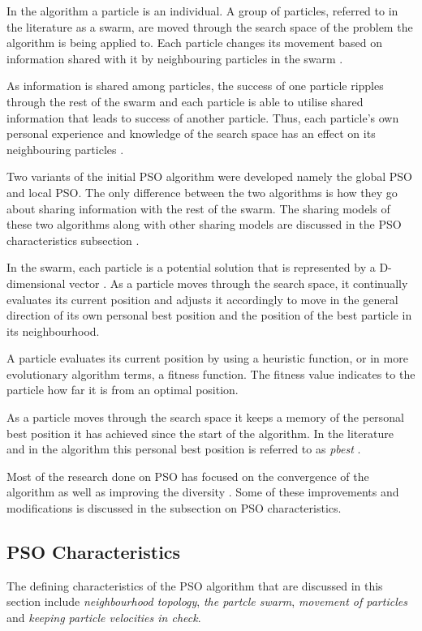 In the algorithm a particle is an individual\cite{FundamentalSwarm}. A group of particles, referred to in the literature as a swarm,  are moved through the search space of the problem the algorithm is being applied to\cite{FundamentalSwarm}. Each particle changes its movement based on information shared with it by neighbouring particles in the swarm \cite{FundamentalSwarm,CompuIntelligenceIntro}. 

As information is shared among particles, the success of one particle ripples through the rest of the swarm and each particle is able to utilise shared information that leads to success of another particle. Thus, each particle's own personal experience and knowledge of the search space has an effect on its neighbouring particles \cite{FundamentalSwarm,CompuIntelligenceIntro}.

Two variants of the initial \gls{PSO} algorithm were developed namely the global \gls{PSO} and local \gls{PSO}. The only difference between the two algorithms is how they go about sharing information with the rest of the swarm. The sharing models of these two algorithms along with other sharing models are discussed in the \gls{PSO} characteristics subsection \cite{SOSwarm}.

In the swarm, each particle is a potential solution that is represented by a D-dimensional vector \cite{PSOHybridJobShop,PSOSelfHierarch}. As a particle moves through the search space, it continually evaluates its current position and adjusts it accordingly to move in the general direction of its own personal best position and the position of the best particle in its neighbourhood. 

A particle evaluates its current position by using a heuristic function, or in more evolutionary algorithm terms, a fitness function. The fitness value indicates to the particle how far it is from an optimal position\cite{CompuIntelligenceIntro}. 

As a particle moves through the search space it keeps a memory of the personal best position it has achieved since the start of the algorithm. In the literature and in the algorithm this personal best position is referred to as \emph{pbest} \cite{SOSwarm}.

Most of the research done on \gls{PSO} has focused on the convergence of the algorithm as well as improving the diversity \cite{FundamentalSwarm}. Some of these improvements and modifications is discussed in the subsection on \gls{PSO} characteristics.

\subsection{PSO Characteristics}
\label{sec:psocharacteristics}
The defining characteristics of the \gls{PSO} algorithm that are discussed in this section include \emph{neighbourhood topology}, \emph{the partcle swarm}, \emph{movement of particles} and \emph{keeping particle velocities in check}.
